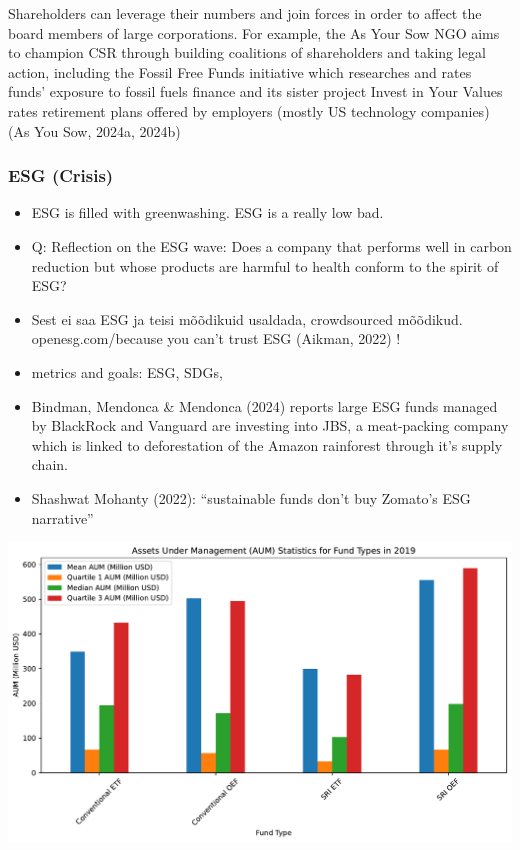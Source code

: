 \documentclass[
  letterpaper,
  DIV=11,
  numbers=noendperiod]{scrartcl}
\begin{document}
Shareholders can leverage their numbers and join forces in order to
affect the board members of large corporations. For example, the As Your
Sow NGO aims to champion CSR through building coalitions of shareholders
and taking legal action, including the Fossil Free Funds initiative
which researches and rates funds' exposure to fossil fuels finance and
its sister project Invest in Your Values rates retirement plans offered
by employers (mostly US technology companies) (As You Sow, 2024a, 2024b)

\subsubsection{ESG (Crisis)}\label{esg-crisis}

\begin{itemize}
\item
  ESG is filled with greenwashing. ESG is a really low bad.
\item
  Q: Reflection on the ESG wave: Does a company that performs well in
  carbon reduction but whose products are harmful to health conform to
  the spirit of ESG?
\item
  Sest ei saa ESG ja teisi mõõdikuid usaldada, crowdsourced mõõdikud.
  openesg.com/because you can't trust ESG (Aikman, 2022) !
\end{itemize}

\begin{itemize}
\item
  metrics and goals: ESG, SDGs,
\item
  Bindman, Mendonca \& Mendonca (2024) reports large ESG funds managed
  by BlackRock and Vanguard are investing into JBS, a meat-packing
  company which is linked to deforestation of the Amazon rainforest
  through it's supply chain.
\item
  Shashwat Mohanty (2022): ``sustainable funds don't buy Zomato's ESG
  narrative''
\end{itemize}

\includegraphics{_thesis_files/figure-pdf/cell-54-output-1.pdf}
\end{document}
